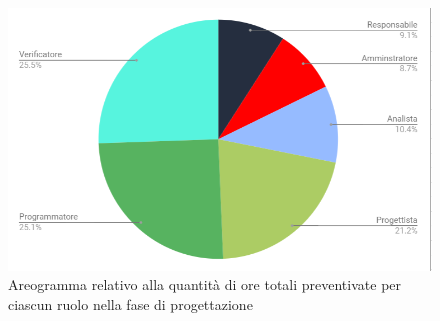 \begin{figure}[h!]
    \centering
	\caption{Areogramma relativo alla quantità di ore totali preventivate per ciascun ruolo nella fase di progettazione}
    \includegraphics[scale=0.50]{./src/Preventivo/src/img/TortaProj.png}  
\end{figure}
